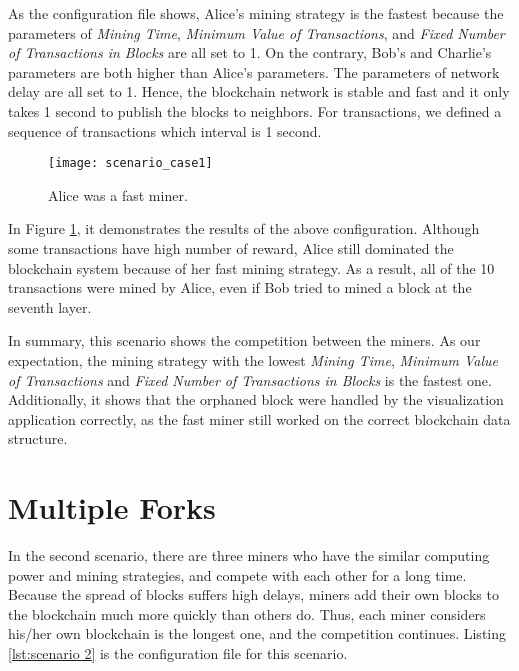 As the configuration file shows, Alice's mining strategy is the fastest because the parameters of \textit{Mining Time}, \textit{Minimum Value of Transactions}, and \textit{Fixed Number of Transactions in Blocks} are all set to 1. On the contrary, Bob's and Charlie's parameters are both higher than Alice's parameters. The parameters of network delay are all set to 1. Hence, the blockchain network is stable and fast and it only takes 1 second to publish the blocks to neighbors. For transactions, we defined a sequence of transactions which interval is 1 second.

\begin{figure}[htb]
    \centering
    \texttt{[image: scenario\_case1]}
    \caption{Alice was a fast miner.}
    \label{fig:alice was a fast miner}
\end{figure}

In Figure \ref{fig:alice was a fast miner}, it demonstrates the results of the above configuration. Although some transactions have high number of reward, Alice still dominated the blockchain system because of her fast mining strategy. As a result, all of the 10 transactions were mined by Alice, even if Bob tried to mined a block at the seventh layer. 

In summary, this scenario shows the competition between the miners. As our expectation, the mining strategy with the lowest \textit{Mining Time}, \textit{Minimum Value of Transactions} and \textit{Fixed Number of Transactions in Blocks} is the fastest one. Additionally, it shows that the orphaned block were handled by the visualization application correctly, as the fast miner still worked on the correct blockchain data structure.

\section{Multiple Forks}

In the second scenario, there are three miners who have the similar computing power and mining strategies, and compete with each other for a long time. Because the spread of blocks suffers high delays, miners add their own blocks to the blockchain much more quickly than others do. Thus, each miner considers his/her own blockchain is the longest one, and the competition continues. Listing \ref{lst:scenario 2} is the configuration file for this scenario.

